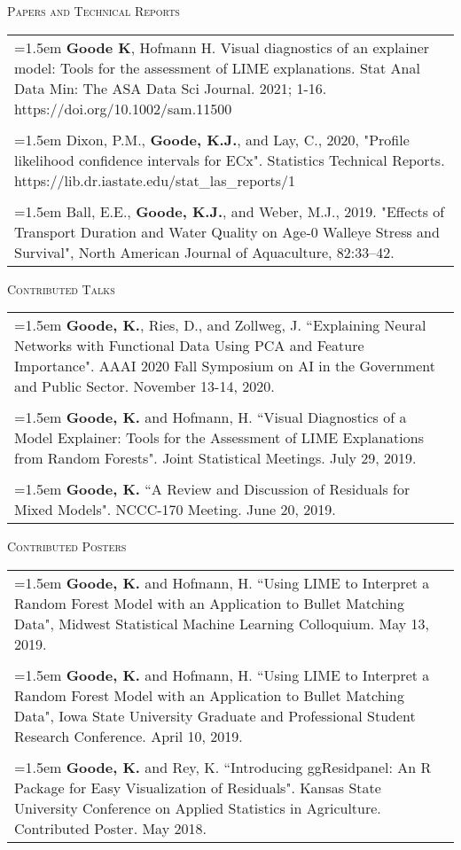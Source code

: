 \documentclass[10pt, oneside]{article}
\begin{document}
\noindent \textsc{Papers and Technical Reports} \hrulefill
\begin{longtable}{p{16.5cm}}
\hangindent=1.5em \textbf{Goode K}, Hofmann H. Visual diagnostics of an explainer model: Tools for the assessment of LIME explanations. Stat Anal Data Min: The ASA Data Sci Journal. 2021; 1-16. https://doi.org/10.1002/sam.11500\\
\\
\hangindent=1.5em Dixon, P.M., \textbf{Goode, K.J.}, and Lay, C., 2020, "Profile likelihood confidence intervals for ECx". Statistics Technical Reports. https://lib.dr.iastate.edu/stat\_las\_reports/1\\
\\
\hangindent=1.5em Ball, E.E., \textbf{Goode, K.J.}, and Weber, M.J., 2019. "Effects of Transport Duration and Water Quality on Age-0 Walleye Stress and Survival", North American Journal of Aquaculture, 82:33–42.
\end{longtable}

\noindent \textsc{Contributed Talks} \hrulefill
\begin{longtable}{p{16.5cm}}
\hangindent=1.5em \textbf{Goode, K.}, Ries, D., and Zollweg, J. ``Explaining Neural Networks with Functional Data Using PCA and Feature Importance". AAAI 2020 Fall Symposium on AI in the Government and Public Sector. November 13-14, 2020.\\
\\
\hangindent=1.5em \textbf{Goode, K.} and Hofmann, H. ``Visual Diagnostics of a Model Explainer: Tools for the Assessment of LIME Explanations from Random Forests". Joint Statistical Meetings. July 29, 2019.\\
\\
\hangindent=1.5em \textbf{Goode, K.} ``A Review and Discussion of Residuals for Mixed Models". NCCC-170 Meeting. June 20, 2019.
\end{longtable}

\noindent \textsc{Contributed Posters} \hrulefill
\begin{longtable}{p{16.5cm}}
\hangindent=1.5em \textbf{Goode, K.} and Hofmann, H. ``Using LIME to Interpret a Random Forest Model with an Application to Bullet Matching Data", Midwest Statistical Machine Learning Colloquium. May 13, 2019.\\
\\ 
\hangindent=1.5em \textbf{Goode, K.} and Hofmann, H. ``Using LIME to Interpret a Random Forest Model with an Application to Bullet Matching Data", Iowa State University Graduate and Professional Student Research Conference. April 10, 2019.\\
\\ 
\hangindent=1.5em \textbf{Goode, K.} and Rey, K. ``Introducing ggResidpanel: An R Package for Easy Visualization of Residuals". Kansas State University Conference on Applied Statistics in Agriculture. Contributed Poster. May 2018.
\end{longtable}
\end{document}
